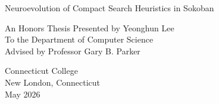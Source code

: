 \begin{titlepage}
    \begin{center}
        \vspace*{4cm}

        \large
         Neuroevolution of Compact Search Heuristics in Sokoban

        \vspace{5cm}

        An Honors Thesis Presented by Yeonghun Lee\\
        To the Department of Computer Science\\
        Advised by Professor Gary B. Parker

        \vfill

        Connecticut College\\
        New London, Connecticut\\
        May 2026

    \end{center}
\end{titlepage}
